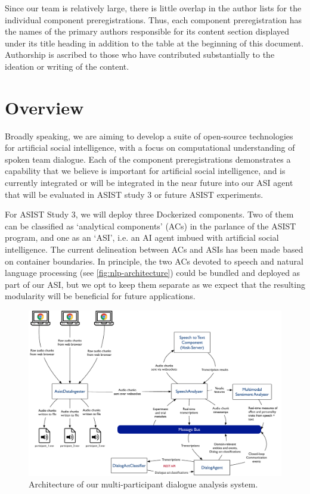 Since our team is relatively large, there is little overlap in the author lists
for the individual component preregistrations. Thus, each component
preregistration has the names of the primary authors responsible for its
content section displayed under its title heading in addition to the table at
the beginning of this document. Authorship is ascribed to those who have
contributed substantially to the ideation or writing of the content.

\section{Overview}

Broadly speaking, we are aiming to develop a suite of open-source technologies
for artificial social intelligence, with a focus on computational understanding
of spoken team dialogue. Each of the component preregistrations demonstrates a
capability that we believe is important for artificial social intelligence, and
is currently integrated or will be integrated in the near future into our ASI
agent that will be evaluated in ASIST study 3 or future ASIST experiments.

For ASIST Study 3, we will deploy three Dockerized components. Two of them can
be classified as `analytical components' (ACs) in the parlance of the ASIST
program, and one as an `ASI', i.e. an AI agent imbued with artificial social
intelligence. The current delineation between ACs and ASIs has been made based
on container boundaries. In principle, the two ACs devoted to speech and
natural language processing (see \autoref{fig:nlp-architecture}) could be
bundled and deployed as part of our ASI, but we opt to keep them separate as we
expect that the resulting modularity will be beneficial for future
applications.

\begin{figure}
    \centering
    \includegraphics[width=6.5in]{images/nlp_architecture}
    \caption{Architecture of our multi-participant dialogue analysis system.}
    \label{fig:nlp-architecture}
\end{figure}

